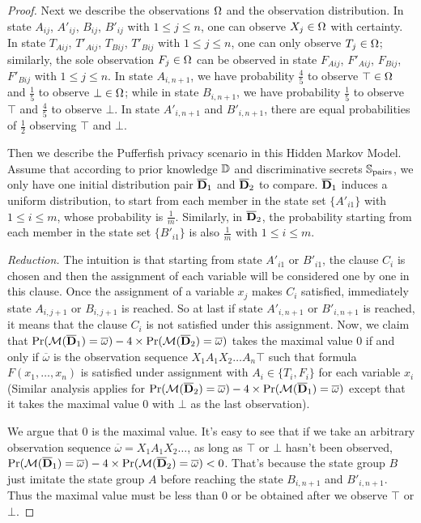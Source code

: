 \begin{proof}
  Next we describe the observations $\Omega$ and the observation distribution. In state
  $A_{ij}$, $A'_{ij}$, $B_{ij}$, $B'_{ij}$ with $1\leq j \leq n$, one can observe $X_j \in \Omega$ with certainty.
  In state $T_{Aij}$, $T'_{Aij}$, $T_{Bij}$, $T'_{Bij}$ with $1\leq j \leq n$, one can only observe $T_j \in \Omega$;
  similarly, the sole observation $F_j \in \Omega$ can be observed in state $F_{Aij}$, $F'_{Aij}$, $F_{Bij}$, $F'_{Bij}$ with $1\leq j \leq n$.
  In state $A_{i,n+1}$, we have probability $\frac{4}{5}$ to observe $\top \in \Omega$ and $\frac{1}{5}$  to observe $\bot \in \Omega$;
  while in state $B_{i,n+1}$, we have probability $\frac{1}{5}$ to observe $\top$ and $\frac{4}{5}$  to observe $\bot$.
  In state $A'_{i,n+1}$ and $B'_{i,n+1}$, there are equal probabilities of $\frac{1}{2}$ observing $\top$ and $\bot$.

  Then we describe the Pufferfish privacy scenario in this Hidden Markov Model. Assume that according to
  prior knowledge $\mathbb{D}$ and discriminative secrets $\mathbb{S}_{\textmd{pairs}}$, we only have
  one initial distribution pair $\overline{\mathbf{D}}_1$ and $\overline{\mathbf{D}}_2$ to compare. $\overline{\mathbf{D}}_1$ induces a uniform distribution,
  to start from each member in the state set $\{A'_{i1}\}$ with $1 \leq i \leq m$, whose probability is $\frac{1}{m}$.
  Similarly, in $\overline{\mathbf{D}}_2$, the probability starting from each member in the state set $\{B'_{i1}\}$ is also $\frac{1}{m}$ with $1 \leq i \leq m$.

  \textit{Reduction.} The intuition is that starting from state $A'_{i1}$ or $B'_{i1}$,
  the clause $C_i$ is chosen and then the assignment of each variable will be considered one by one
  in this clause. Once the assignment of a variable $x_j$ makes $C_i$ satisfied, immediately
  state $A_{i,j+1}$ or $B_{i,j+1}$ is reached. So at last if state $A'_{i,n+1}$ or $B'_{i,n+1}$
  is reached, it means that the clause $C_i$ is not satisfied under this assignment. Now, we
  claim that  $\Pr (\mathcal{M} (\overline{\mathbf{D}}_1) = \overline{\omega}) - 4 \times \Pr (\mathcal{M} (\overline{\mathbf{D}}_2) = \overline{\omega})$ takes the maximal value $0$
  if and only if $\overline{\omega}$ is the observation sequence $X_1A_1X_2\ldots A_n \top$ such that
  formula $F(x_1,\ldots,x_n)$ is satisfied under assignment with $A_i \in \{T_i,F_i\}$ for each variable $x_i$
  (Similar analysis applies for $\Pr (\mathcal{M} (\overline{\mathbf{D}}_2) = \overline{\omega}) - 4 \times \Pr (\mathcal{M} (\overline{\mathbf{D}}_1) = \overline{\omega})$ except that it takes the
   maximal value $0$ with $\bot$ as the last observation).

  We argue that $0$ is the maximal value.
  It's easy to see that if we take an arbitrary observation sequence $\overline{\omega} = X_1A_1X_2\ldots $,
  as long as $\top$ or $\bot$ hasn't been observed, $\Pr (\mathcal{M} (\overline{\mathbf{D}}_1) = \overline{\omega}) -  4 \times \Pr (\mathcal{M} (\overline{\mathbf{D}}_2) = \overline{\omega}) < 0$.
  That's because the state group $B$ just imitate the state group $A$ before reaching the state
  $B_{i,n+1}$ and $B'_{i,n+1}$. Thus the maximal value must be less than 0 or be obtained after we observe $\top$
  or $\bot$.


\end{proof}
